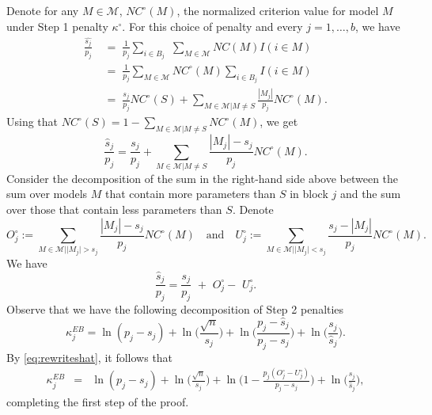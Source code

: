 \documentclass[bj,authoryear]{imsart}
\theoremstyle{plain}
\newcommand{\M}{\mathcal{M}}
\begin{document}
Denote for any $M\in\M$, $NC^{\circ}(M)$, the normalized criterion value for model $M$ under Step 1 penalty $\kappa^{\circ}$. For this choice of penalty and every $j=1,\ldots,b$, we have
\begin{align*}
    \frac{\widehat{s_j}}{p_j}
    &\;=\; \frac{1}{p_j}\sum_{i\in B_j}\,\,\sum_{M\in \M}NC(M)I(i\in M)\\
   &\;=\; \frac{1}{p_j}\sum_{M \in \M}NC^{\circ}(M)\sum_{i \in B_j}I(i\in M) \\
   &\;=\;\frac{s_j}{p_j}NC^{\circ}(S) + \sum_{M \in \M | M \neq S}\frac{|M_j|}{p_j}NC^{\circ}(M).
\end{align*}
Using that $NC^{\circ}(S)=1-\sum_{M \in \M | M \neq S}NC^{\circ}(M)$, we get
\begin{equation*}
   \frac{\hat{s}_j}{p_j}
   =\frac{s_j}{p_j} + \sum_{M \in \M | M \neq S}\frac{|M_j|-s_j}{p_j}NC^{\circ}(M).
\end{equation*}
Consider the decomposition of the sum in the right-hand side above between the sum over models $M$ that contain more parameters than $S$ in block $j$ and the sum over those that contain less parameters than $S$. Denote
$$
    O_j^{\circ} := \sum_{M \in \M | |M_j| > s_j}\frac{|M_j|-s_j}{p_j}NC^{\circ}(M)\quad\text{and}\quad
    U_j^{\circ} := \sum_{M \in \M | |M_j| < s_j}\frac{s_j-|M_j|}{p_j}NC^{\circ}(M).
$$
We have
\begin{equation}\label{eq:rewriteshat}
  \frac{\hat{s}_j}{p_j}  = \frac{s_j}{p_j}\,\,+\,\, O_j^{\circ}-\,\,U_j^{\circ}.
\end{equation}
Observe that we have the following decomposition of Step 2 penalties
$$\kappa^{EB}_j
    = \ln(p_j-s_j) + \ln\Big(\frac{\sqrt{n}}{s_j}\Big) + \ln\Big(\frac{p_j-\hat{s}_j}{p_j-s_j}\Big) + \ln\Big(\frac{s_j}{\hat{s}_j}\Big). \nonumber$$
By \eqref{eq:rewriteshat}, it follows that
\begin{eqnarray}\label{eq:decompstep2pen}
    \kappa^{EB}_j&=& \ln(p_j-s_j)+\ln\Big(\frac{\sqrt{n}}{s_j}\Big)+\ln\Big(1-\frac{p_j(O^{\circ}_j-U^{\circ}_j)}{p_j-s_j}\Big)+\ln\Big(\frac{s_j}{\hat{s}_j}\Big),
\end{eqnarray}
completing the first step of the proof.
\end{document}

